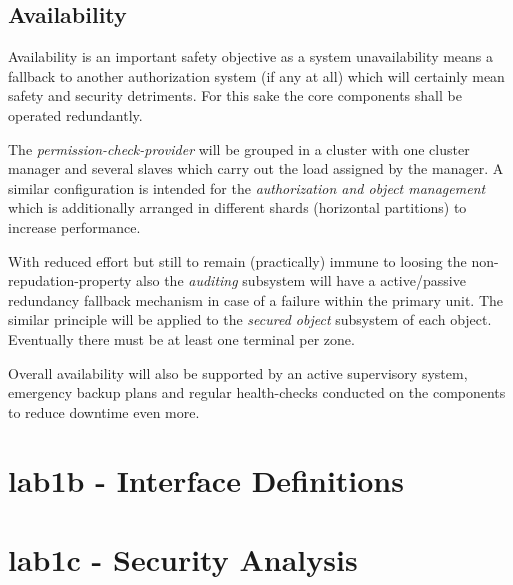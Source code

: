 \documentclass[12pt,a4paper,titlepage,oneside]{scrartcl}
\begin{document}
\subsection{Availability}
Availability is an important safety objective as a system unavailability means a fallback to another authorization system (if any at all)
which will certainly mean safety and security detriments. For this sake the core components shall be operated redundantly.

The \emph{permission-check-provider} will be grouped in a cluster with one cluster manager and several slaves which carry
out the load assigned by the manager. A similar configuration is intended for the \emph{authorization and object management} 
which is additionally arranged in different shards (horizontal partitions) to increase performance.

With reduced effort but still to remain (practically) immune to loosing the non-repudation-property also the \emph{auditing} subsystem
will have a active/passive redundancy fallback mechanism in case of a failure within the primary unit. The similar principle
will be applied to the \emph{secured object} subsystem of each object. Eventually there must be at least one terminal per zone.

Overall availability will also be supported by an active supervisory system, emergency backup plans and regular health-checks
conducted on the components to reduce downtime even more.


\section{lab1b - Interface Definitions}

\section{lab1c - Security Analysis}


%
%
\end{document}
